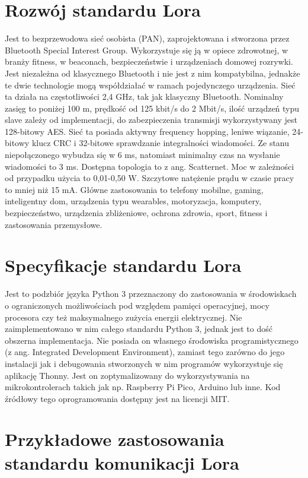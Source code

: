 \section{Rozwój standardu Lora}
Jest to bezprzewodowa sieć osobista (PAN), zaprojektowana i stworzona przez Bluetooth Special Interest Group. Wykorzystuje się ją w opiece zdrowotnej, w branży fitness, w beaconach, bezpieczeństwie i urządzeniach domowej rozrywki. Jest niezależna od klasycznego Bluetooth i nie jest z nim kompatybilna, jednakże te dwie technologie mogą współdziałać w ramach pojedynczego urządzenia.
Sieć ta działa na częstotliwości 2,4 GHz, tak jak klasyczny Bluetooth.
Nominalny zasięg to poniżej 100 m, prędkość od 125 kbit/s do 2 Mbit/s, ilość urządzeń typu slave zależy od implementacji, do zabezpieczenia transmisji wykorzystywany jest 128-bitowy AES.
Sieć ta posiada aktywny frequency hopping, leniwe wiązanie, 24-bitowy klucz CRC i 32-bitowe sprawdzanie integralności wiadomości.
Ze stanu niepołączonego wybudza się w 6 ms, natomiast minimalny czas na wysłanie wiadomości to 3 ms.
Dostępna topologia to z ang. Scatternet.
Moc w zależności od przypadku użycia to 0,01-0,50 W.
Szczytowe natężenie prądu w czasie pracy to mniej niż 15 mA.
Główne zastosowania to telefony mobilne, gaming, inteligentny dom, urządzenia typu wearables, motoryzacja, komputery, bezpieczeństwo, urządzenia zbliżeniowe, ochrona zdrowia, sport, fitness i zastosowania przemysłowe\cite{Wikipedia:ble:2024}.
\section{Specyfikacje standardu Lora}
Jest to podzbiór języka Python 3 przeznaczony do zastosowania w środowiskach o ograniczonych możliwościach pod względem pamięci operacyjnej, mocy procesora czy też maksymalnego zużycia energii elektrycznej. Nie zaimplementowano w nim całego standardu Python 3, jednak jest to dość obszerna implementacja. Nie posiada on własnego środowiska programistycznego (z ang. Integrated Development Environment), zamiast tego zarówno do jego instalacji jak i debugowania stworzonych w nim programów wykorzystuje się aplikację Thonny.
Jest on zoptymalizowany do wykorzystywania na mikrokontrolerach takich jak np. Raspberry Pi Pico, Arduino lub inne.
Kod źródłowy tego oprogramowania dostępny jest na licencji MIT.\cite{wiki:micropython:2024}
\section{Przykładowe zastosowania standardu komunikacji Lora}